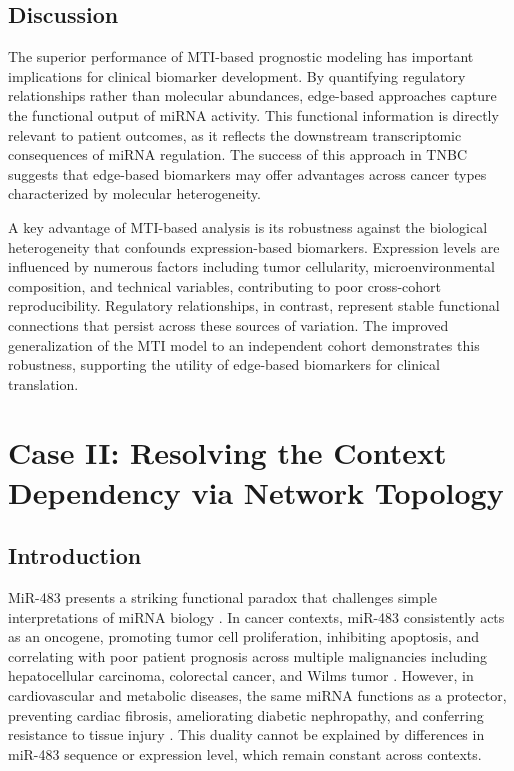 \subsection{Discussion}

The superior performance of MTI-based prognostic modeling has important implications for clinical biomarker development. By quantifying regulatory relationships rather than molecular abundances, edge-based approaches capture the functional output of miRNA activity. This functional information is directly relevant to patient outcomes, as it reflects the downstream transcriptomic consequences of miRNA regulation. The success of this approach in TNBC suggests that edge-based biomarkers may offer advantages across cancer types characterized by molecular heterogeneity.

A key advantage of MTI-based analysis is its robustness against the biological heterogeneity that confounds expression-based biomarkers. Expression levels are influenced by numerous factors including tumor cellularity, microenvironmental composition, and technical variables, contributing to poor cross-cohort reproducibility. Regulatory relationships, in contrast, represent stable functional connections that persist across these sources of variation. The improved generalization of the MTI model to an independent cohort demonstrates this robustness, supporting the utility of edge-based biomarkers for clinical translation.

\section{Case II: Resolving the Context Dependency via Network Topology}

\subsection{Introduction}

MiR-483 presents a striking functional paradox that challenges simple interpretations of miRNA biology \cite{liu2021mirna,menbari2020suppress,peng2022microrna}. In cancer contexts, miR-483 consistently acts as an oncogene, promoting tumor cell proliferation, inhibiting apoptosis, and correlating with poor patient prognosis across multiple malignancies including hepatocellular carcinoma, colorectal cancer, and Wilms tumor \cite{niu2018inhibits,mccann2017expressi,zhou2021promotes,liang2019regulate,cui2016derived,sun2021binding,candiell2023microrna,song2014promotes,wang2012retinoic,huang2018tumor}. However, in cardiovascular and metabolic diseases, the same miRNA functions as a protector, preventing cardiac fibrosis, ameliorating diabetic nephropathy, and conferring resistance to tissue injury \cite{fernande2019disturbe,kong2016upregula,qiao2016regulate,qiao2011controls,saddic2015integrat,sun2018regulate,zhang2020inhibiti,leng2020high}. This duality cannot be explained by differences in miR-483 sequence or expression level, which remain constant across contexts.

